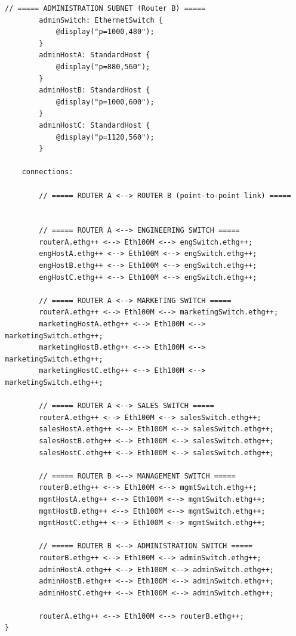 \documentclass[11pt,a4paper]{article}
\begin{document}
\begin{lstlisting}[style=labcode]
        // ===== ADMINISTRATION SUBNET (Router B) =====
        adminSwitch: EthernetSwitch {
            @display("p=1000,480");
        }
        adminHostA: StandardHost {
            @display("p=880,560");
        }
        adminHostB: StandardHost {
            @display("p=1000,600");
        }
        adminHostC: StandardHost {
            @display("p=1120,560");
        }

    connections:

        // ===== ROUTER A <--> ROUTER B (point-to-point link) =====


        // ===== ROUTER A <--> ENGINEERING SWITCH =====
        routerA.ethg++ <--> Eth100M <--> engSwitch.ethg++;
        engHostA.ethg++ <--> Eth100M <--> engSwitch.ethg++;
        engHostB.ethg++ <--> Eth100M <--> engSwitch.ethg++;
        engHostC.ethg++ <--> Eth100M <--> engSwitch.ethg++;

        // ===== ROUTER A <--> MARKETING SWITCH =====
        routerA.ethg++ <--> Eth100M <--> marketingSwitch.ethg++;
        marketingHostA.ethg++ <--> Eth100M <--> marketingSwitch.ethg++;
        marketingHostB.ethg++ <--> Eth100M <--> marketingSwitch.ethg++;
        marketingHostC.ethg++ <--> Eth100M <--> marketingSwitch.ethg++;

        // ===== ROUTER A <--> SALES SWITCH =====
        routerA.ethg++ <--> Eth100M <--> salesSwitch.ethg++;
        salesHostA.ethg++ <--> Eth100M <--> salesSwitch.ethg++;
        salesHostB.ethg++ <--> Eth100M <--> salesSwitch.ethg++;
        salesHostC.ethg++ <--> Eth100M <--> salesSwitch.ethg++;

        // ===== ROUTER B <--> MANAGEMENT SWITCH =====
        routerB.ethg++ <--> Eth100M <--> mgmtSwitch.ethg++;
        mgmtHostA.ethg++ <--> Eth100M <--> mgmtSwitch.ethg++;
        mgmtHostB.ethg++ <--> Eth100M <--> mgmtSwitch.ethg++;
        mgmtHostC.ethg++ <--> Eth100M <--> mgmtSwitch.ethg++;

        // ===== ROUTER B <--> ADMINISTRATION SWITCH =====
        routerB.ethg++ <--> Eth100M <--> adminSwitch.ethg++;
        adminHostA.ethg++ <--> Eth100M <--> adminSwitch.ethg++;
        adminHostB.ethg++ <--> Eth100M <--> adminSwitch.ethg++;
        adminHostC.ethg++ <--> Eth100M <--> adminSwitch.ethg++;

        routerA.ethg++ <--> Eth100M <--> routerB.ethg++;
}
\end{lstlisting}
\end{document}
